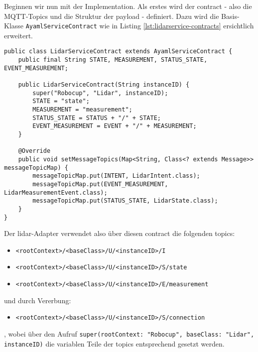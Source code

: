 Beginnen wir nun mit der Implementation. Als erstes wird der \Gls{contract} - also die MQTT-Topics und die Struktur der \Gls{payload} - definiert. Dazu wird die Basis-Klasse \verb|AyamlServiceContract| wie in Listing \ref{lst:lidarservice-contracts} ersichtlich erweitert.
\begin{lstlisting}[caption={Lidar-Adapter - Contracts},label={lst:lidarservice-contracts}]
public class LidarServiceContract extends AyamlServiceContract {
    public final String STATE, MEASUREMENT, STATUS_STATE, EVENT_MEASUREMENT;

    public LidarServiceContract(String instanceID) {
        super("Robocup", "Lidar", instanceID);
        STATE = "state";
        MEASUREMENT = "measurement";
        STATUS_STATE = STATUS + "/" + STATE;
        EVENT_MEASUREMENT = EVENT + "/" + MEASUREMENT;
    }

    @Override
    public void setMessageTopics(Map<String, Class<? extends Message>> messageTopicMap) {
        messageTopicMap.put(INTENT, LidarIntent.class);
        messageTopicMap.put(EVENT_MEASUREMENT, LidarMeasurementEvent.class);
        messageTopicMap.put(STATUS_STATE, LidarState.class);
    }
}
\end{lstlisting}
Der \acrshort{lidar}-Adapter verwendet also über diesen \Gls{contract} die folgenden \Glspl{topic}:
\begin{itemize}
	\item \verb|<rootContext>/<baseClass>/U/<instanceID>/I|
	\item \verb|<rootContext>/<baseClass>/U/<instanceID>/S/state|
	\item \verb|<rootContext>/<baseClass>/U/<instanceID>/E/measurement|
\end{itemize}
und durch Vererbung:
\begin{itemize}
	\item \verb|<rootContext>/<baseClass>/U/<instanceID>/S/connection|
\end{itemize}
, wobei über den Aufruf \verb|super(rootContext: "Robocup", baseClass: "Lidar", instanceID)| die variablen Teile der \Glspl{topic} entsprechend gesetzt werden.

